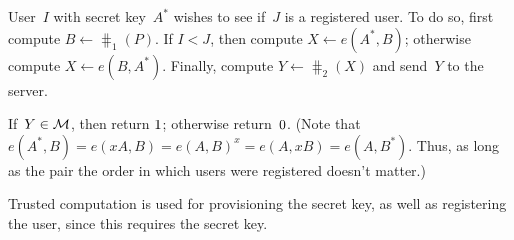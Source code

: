 \documentclass{build/llncs}
\begin{document}
%
User~$I$ with secret key~$A^*$ wishes to see if~$J$ is a registered user. To do
so, first compute $B \gets \hash_1(P)$. If $I < J$, then compute $X \gets e(A^*,
B)$; otherwise compute $X \gets e(B, A^*)$. Finally, compute $Y \gets
\hash_2(X)$ and send~$Y$ to the server.

%
If~$Y \in \mathcal{M}$, then return $1$; otherwise return~$0$. (Note that
$e(A^*, B) = e(xA, B) = e(A, B)^{x} = e(A, xB) = e(A, B^*)$. Thus, as long as
the pair the order in which users were registered doesn't matter.)

%
Trusted computation is used for provisioning the secret key, as well as
registering the user, since this requires the secret key.




\ifnum{}
 
 \else

\fi
\end{document}
